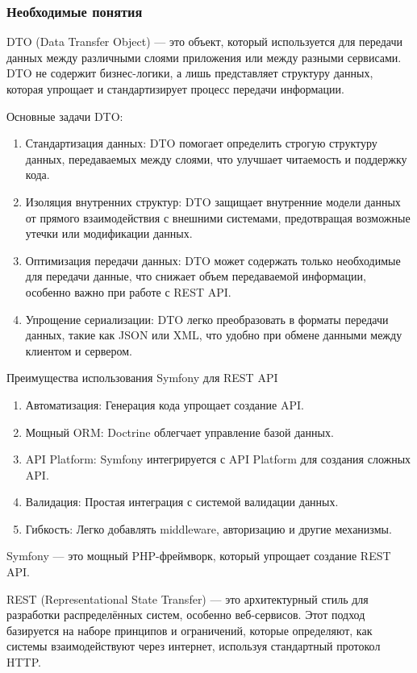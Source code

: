 \documentclass[pract]{SCWorks}
\begin{document}
\subsubsection{Необходимые понятия}

DTO (Data Transfer Object) — это объект, который используется для передачи 
данных между различными слоями приложения или между разными сервисами. DTO 
не содержит бизнес-логики, а лишь представляет структуру данных, которая 
упрощает и стандартизирует процесс передачи информации.

Основные задачи DTO:
\begin{enumerate}
    \item Стандартизация данных: DTO помогает определить строгую структуру 
    данных, передаваемых между слоями, что улучшает читаемость и поддержку кода.
    \item Изоляция внутренних структур: DTO защищает внутренние модели данных 
    от прямого взаимодействия с внешними системами, предотвращая возможные 
    утечки или модификации данных.
    \item Оптимизация передачи данных: DTO может содержать только необходимые 
    для передачи данные, что снижает объем передаваемой информации, особенно 
    важно при работе с REST API.
    \item Упрощение сериализации: DTO легко преобразовать в форматы передачи 
    данных, такие как JSON или XML, что удобно при обмене данными между 
    клиентом и сервером.
\end{enumerate}

Преимущества использования Symfony для REST API
\begin{enumerate}
    \item Автоматизация: Генерация кода упрощает создание API.
    \item Мощный ORM: Doctrine облегчает управление базой данных.
    \item API Platform: Symfony интегрируется с API Platform для создания 
    сложных API.
    \item Валидация: Простая интеграция с системой валидации данных.
    \item Гибкость: Легко добавлять middleware, авторизацию и другие механизмы.
\end{enumerate}

Symfony — это мощный PHP-фреймворк, который упрощает создание REST API.

REST (Representational State Transfer) — это архитектурный стиль для 
разработки распределённых систем, особенно веб-сервисов. Этот подход 
базируется на наборе принципов и ограничений, которые определяют, как 
системы взаимодействуют через интернет, используя стандартный протокол HTTP.
\end{document}
